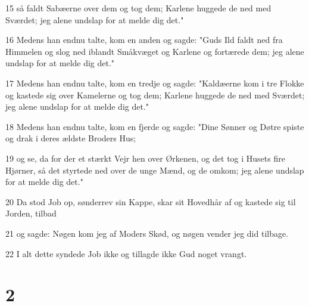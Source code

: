 \par 15 så faldt Sabæerne over dem og tog dem; Karlene huggede de ned med Sværdet; jeg alene undslap for at melde dig det."
\par 16 Medens han endnu talte, kom en anden og sagde: "Guds Ild faldt ned fra Himmelen og slog ned iblandt Småkvæget og Karlene og fortærede dem; jeg alene undslap for at melde dig det."
\par 17 Medens han endnu talte, kom en tredje og sagde: "Kaldæerne kom i tre Flokke og kastede sig over Kamelerne og tog dem; Karlene huggede de ned med Sværdet; jeg alene undslap for at melde dig det."
\par 18 Medens han endnu talte, kom en fjerde og sagde: "Dine Sønner og Døtre spiste og drak i deres ældste Broders Hus;
\par 19 og se, da for der et stærkt Vejr hen over Ørkenen, og det tog i Husets fire Hjørner, så det styrtede ned over de unge Mænd, og de omkom; jeg alene undslap for at melde dig det."
\par 20 Da stod Job op, sønderrev sin Kappe, skar sit Hovedhår af og kastede sig til Jorden, tilbad
\par 21 og sagde: Nøgen kom jeg af Moders Skød, og nøgen vender jeg did tilbage.
\par 22 I alt dette syndede Job ikke og tillagde ikke Gud noget vrangt.

\chapter{2}

